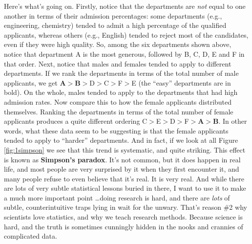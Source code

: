 \documentclass[]{book}
\begin{document}
Here's what's going on. Firstly, notice that the departments are \emph{not} equal to one another in terms of their admission percentages: some departments (e.g., engineering, chemistry) tended to admit a high percentage of the qualified applicants, whereas others (e.g., English) tended to reject most of the candidates, even if they were high quality. So, among the six departments shown above, notice that department A is the most generous, followed by B, C, D, E and F in that order. Next, notice that males and females tended to apply to different departments. If we rank the departments in terms of the total number of male applicants, we get \textbf{A}\(>\)\textbf{B}\(>\)D\(>\)C\(>\)F\(>\)E (the ``easy'' departments are in bold). On the whole, males tended to apply to the departments that had high admission rates. Now compare this to how the female applicants distributed themselves. Ranking the departments in terms of the total number of female applicants produces a quite different ordering C\(>\)E\(>\)D\(>\)F\(>\)\textbf{A}\(>\)\textbf{B}. In other words, what these data seem to be suggesting is that the female applicants tended to apply to ``harder'' departments. And in fact, if we look at all Figure \ref{fig:1simpson} we see that this trend is systematic, and quite striking. This effect is known as \textbf{Simpson's paradox}. It's not common, but it does happen in real life, and most people are very surprised by it when they first encounter it, and many people refuse to even believe that it's real. It is very real. And while there are lots of very subtle statistical lessons buried in there, I want to use it to make a much more important point \ldots{}doing research is hard, and there are \emph{lots} of subtle, counterintuitive traps lying in wait for the unwary. That's reason \#2 why scientists love statistics, and why we teach research methods. Because science is hard, and the truth is sometimes cunningly hidden in the nooks and crannies of complicated data.
\end{document}
